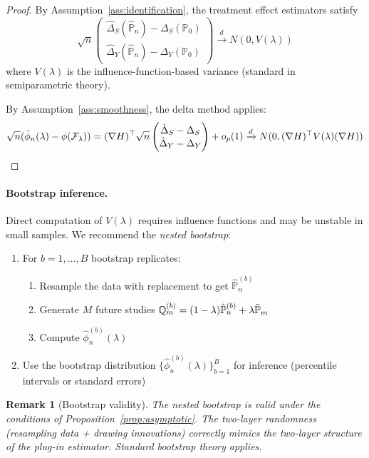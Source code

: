 \documentclass{article}
\newtheorem{remark}{Remark}
\newcommand{\PP}{\mathbb{P}}
\begin{document}
\begin{proof}
By Assumption~\ref{ass:identification}, the treatment effect estimators satisfy
\[
    \sqrt{n}\begin{pmatrix} \hat{\Delta}_S(\hat{\PP}_n) - \Delta_S(\PP_0) \\
                            \hat{\Delta}_Y(\hat{\PP}_n) - \Delta_Y(\PP_0)
    \end{pmatrix}
    \xrightarrow{d} N(0, V(\lambda))
\]
where $V(\lambda)$ is the influence-function-based variance (standard in
semiparametric theory).

By Assumption~\ref{ass:smoothness}, the delta method applies:
\[
    \sqrt{n}(\hat{\phi}_n(\lambda) - \phi(\mathcal{F}_\lambda))
    = (\nabla H)^\top \sqrt{n}\begin{pmatrix} \hat{\Delta}_S - \Delta_S \\
                                              \hat{\Delta}_Y - \Delta_Y
                      \end{pmatrix} + o_p(1)
    \xrightarrow{d} N(0, (\nabla H)^\top V(\lambda) (\nabla H))
\]
\end{proof}

\paragraph{Bootstrap inference.}
Direct computation of $V(\lambda)$ requires influence functions and may be
unstable in small samples. We recommend the \textit{nested bootstrap}:
\begin{enumerate}
    \item For $b = 1, \ldots, B$ bootstrap replicates:
          \begin{enumerate}
              \item Resample the data with replacement to get $\hat{\PP}_n^{(b)}$
              \item Generate $M$ future studies $\Q_m^{(b)} = (1-\lambda)\hat{\PP}_n^{(b)} + \lambda\tilde{\PP}_m$
              \item Compute $\hat{\phi}_n^{(b)}(\lambda)$
          \end{enumerate}
    \item Use the bootstrap distribution $\{\hat{\phi}_n^{(b)}(\lambda)\}_{b=1}^B$
          for inference (percentile intervals or standard errors)
\end{enumerate}

\begin{remark}[Bootstrap validity]
The nested bootstrap is valid under the conditions of Proposition~\ref{prop:asymptotic}.
The two-layer randomness (resampling data + drawing innovations) correctly
mimics the two-layer structure of the plug-in estimator. Standard bootstrap
theory applies.
\end{remark}
\end{document}
